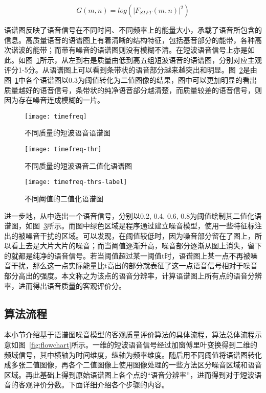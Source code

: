 \begin{equation}\label{eq:log_dstft}
G(m, n) = log(|F_{STFT}(m, n)|^2)
\end{equation}

语谱图反映了语音信号在不同时间、不同频率上的能量大小，承载了语音所包含的信息。高质量语音的语谱图上有着清晰的结构特征，包括基音部分的能带，各种高次谐波的能带；而带有噪音的语谱图则没有模糊不清。在短波语音信号上亦是如此。如图~\ref{fig:timefreq}所示，从左到右是质量由低到高五组短波语音的语谱图，分别对应主观评分1-5分。从语谱图上可以看到条带状的语音部分越来越突出和明显。图~\ref{fig:timefreq-thr0.3}是由图~\ref{fig:timefreq}中各个语谱图以0.3为阈值转化为二值图像的结果，图中可以更加明显的看出质量越好的语音信号，条带状的纯净语音部分越清楚，而质量较差的语音信号，则因为存在噪音连成模糊的一片。

\begin{figure}
\centering
\texttt{[image: timefreq]}
\caption{不同质量的短波语音语谱图\label{fig:timefreq}}
\end{figure}

\begin{figure}
\centering
\texttt{[image: timefreq-thr]}
\caption{不同质量的短波语音二值化语谱图\label{fig:timefreq-thr0.3}}
\end{figure}

\begin{figure}
\centering
\texttt{[image: timefreq-thrs-label]}
\caption{不同阈值的二值化语谱图\label{fig:timefreq-thrs-label}}
\end{figure}

进一步地，从中选出一个语音信号，分别以0.2, 0.4, 0.6, 0.8为阈值绘制其二值化语谱图，如图~\ref{fig:timefreq-thrs-label}所示。而图中绿色区域是程序通过建立噪音模型，使用一些特征标注出的被噪音干扰的区域。可以发现，在阈值较低时，因为噪音部分留在了图上，所以看上去是大片大片的噪音；而当阈值逐渐升高，噪音部分逐渐从图上消失，留下的就都是纯净的语音信号。若当阈值超过某一阈值t时，语谱图上某一点不再被噪音干扰，那么这一点实际能量比t高出的部分就表征了这一点语音信号相对于噪音部分高出的强度。本文称之为该点的语音分辨率，计算语谱图上所有点的语音分辨率，进而得出语音质量的客观评价分。

\subsection{算法流程}

本小节介绍基于语谱图噪音模型的客观质量评价算法的具体流程，算法总体流程示意如图~\ref{fig:flowchart}所示。一维的短波语音信号经过加窗傅里叶变换得到二维的频域信号，其中横轴为时间维度，纵轴为频率维度。随后用不同阈值将语谱图转化成多张二值图像，再各个二值图像上使用图像处理的一些方法区分噪音区域和语音区域。再此基础上得到原始语谱图上各个点的“语音分辨率”，进而得到对于短波语音的客观评价分数。下面详细介绍各个步骤的内容。

